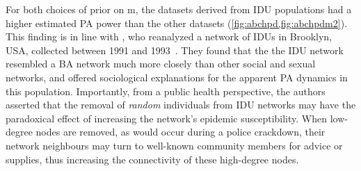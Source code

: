 For both choices of prior on \gls{m}, the datasets derived from \gls{IDU}
populations had a higher estimated \acrlong{PA} power than the other datasets
(\cref{fig:abchpd,fig:abchpdm2}). This finding is in line with
\textcite{dombrowski2013topological}, who reanalyzed a network of \glspl{IDU}
in Brooklyn, USA, collected between 1991 and
1993~\autocite{friedman2006social}. They found that the the \gls{IDU} network 
resembled a \gls{BA} network much more closely than other social and sexual 
networks, and offered sociological explanations for the apparent \acrlong{PA}
dynamics in this population. Importantly, from a public health perspective,
the authors asserted that the removal of \emph{random} individuals from
\gls{IDU} networks may have the paradoxical effect of increasing the network's
epidemic susceptibility. When low-degree nodes are removed, as would occur
during a police crackdown, their network neighbours may turn to well-known
community members for advice or supplies, thus increasing the connectivity of
these high-degree nodes.


